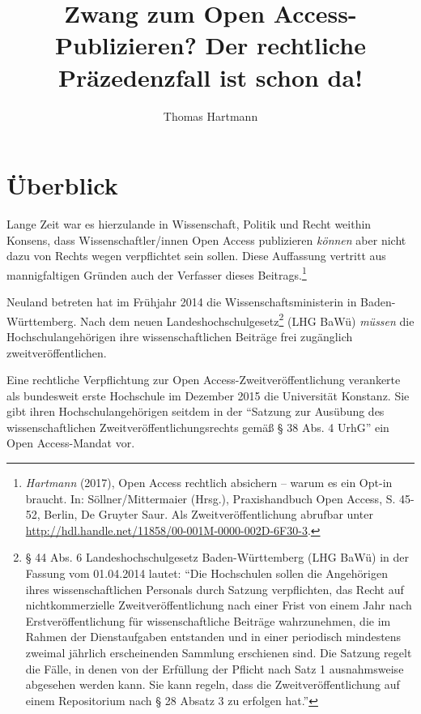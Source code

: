 \documentclass[a4paper,
fontsize=11pt,
oneside,
numbers=noperiodatend,
parskip=half-,
bibliography=totoc,
final
]{scrartcl}
\title{\LARGE{Zwang zum Open Access-Publizieren? Der rechtliche Präzedenzfall ist schon da!}} %
\author{Thomas Hartmann} %
\date{}
\begin{document}
\maketitle
\thispagestyle{fancyplain} 


\hypertarget{uxfcberblick}{%
\section*{Überblick}\label{uxfcberblick}}

Lange Zeit war es hierzulande in Wissenschaft, Politik und Recht weithin
Konsens, dass Wissenschaftler/innen Open Access publizieren
\emph{können} aber nicht dazu von Rechts wegen verpflichtet sein sollen.
Diese Auffassung vertritt aus mannigfaltigen Gründen auch der Verfasser
dieses Beitrags.\footnote{\emph{Hartmann} (2017), Open Access rechtlich
  absichern -- warum es ein Opt-in braucht. In: Söllner/Mittermaier
  (Hrsg.), Praxishandbuch Open Access, S. 45-52, Berlin, De Gruyter
  Saur. Als Zweitveröffentlichung abrufbar unter
  \url{http://hdl.handle.net/11858/00-001M-0000-002D-6F30-3}.}

Neuland betreten hat im Frühjahr 2014 die Wissenschaftsministerin in
Baden-Württemberg. Nach dem neuen Landeshochschulgesetz\footnote{§ 44
  Abs. 6 Landeshochschulgesetz Baden-Württemberg (LHG BaWü) in der
  Fassung vom 01.04.2014 lautet: \enquote{Die Hochschulen sollen die
  Angehörigen ihres wissenschaftlichen Personals durch Satzung
  verpflichten, das Recht auf nichtkommerzielle Zweitveröffentlichung
  nach einer Frist von einem Jahr nach Erstveröffentlichung für
  wissenschaftliche Beiträge wahrzunehmen, die im Rahmen der
  Dienstaufgaben entstanden und in einer periodisch mindestens zweimal
  jährlich erscheinenden Sammlung erschienen sind. Die Satzung regelt
  die Fälle, in denen von der Erfüllung der Pflicht nach Satz 1
  ausnahmsweise abgesehen werden kann. Sie kann regeln, dass die
  Zweitveröffentlichung auf einem Repositorium nach § 28 Absatz 3 zu
  erfolgen hat.}} (LHG BaWü) \emph{müssen} die Hochschulangehörigen ihre
wissenschaftlichen Beiträge frei zugänglich zweitveröffentlichen.

Eine rechtliche Verpflichtung zur Open Access-Zweitveröffentlichung
verankerte als bundesweit erste Hochschule im Dezember 2015 die
Universität Konstanz. Sie gibt ihren Hochschulangehörigen seitdem in der
\enquote{Satzung zur Ausübung des wissenschaftlichen
Zweit\-ver\-öffent\-lich\-ungs\-rechts gemäß § 38 Abs. 4 UrhG} ein Open
Access-Mandat vor.
\end{document}
